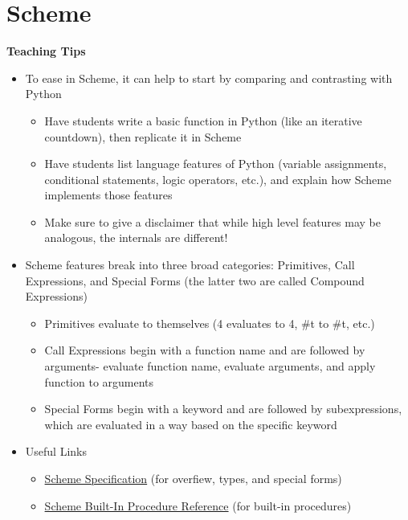 \documentclass{exam}
\begin{document}
\section{Scheme}
\begin{guide}
\begin{blocksection}
\textbf{Teaching Tips}
\begin{itemize}
  \item To ease in Scheme, it can help to start by comparing and contrasting with Python
  \begin{itemize}
    \item Have students write a basic function in Python (like an iterative countdown), then replicate it in Scheme
    \item Have students list language features of Python (variable assignments, conditional statements, logic operators, etc.), and explain how Scheme implements those features
    \item Make sure to give a disclaimer that while high level features may be analogous, the internals are different!
  \end{itemize}
  \item Scheme features break into three broad categories: Primitives, Call Expressions, and Special Forms (the latter two are called Compound Expressions)
  \begin{itemize}
    \item Primitives evaluate to themselves (4 evaluates to 4, \#t to \#t, etc.)
    \item Call Expressions begin with a function name and are followed by arguments- evaluate function name, evaluate arguments, and apply function to arguments
    \item Special Forms begin with a keyword and are followed by subexpressions, which are evaluated in a way based on the specific keyword
  \end{itemize}
  \item Useful Links
  \begin{itemize}
    \item \href{https://cs61a.org/articles/scheme-spec/}{Scheme Specification} (for overfiew, types, and special forms)
    \item \href{https://cs61a.org/articles/scheme-builtins/}{Scheme Built-In Procedure Reference} (for built-in procedures)
  \end{itemize} 
\end{itemize}
\end{blocksection}
\end{guide}
\end{document}
